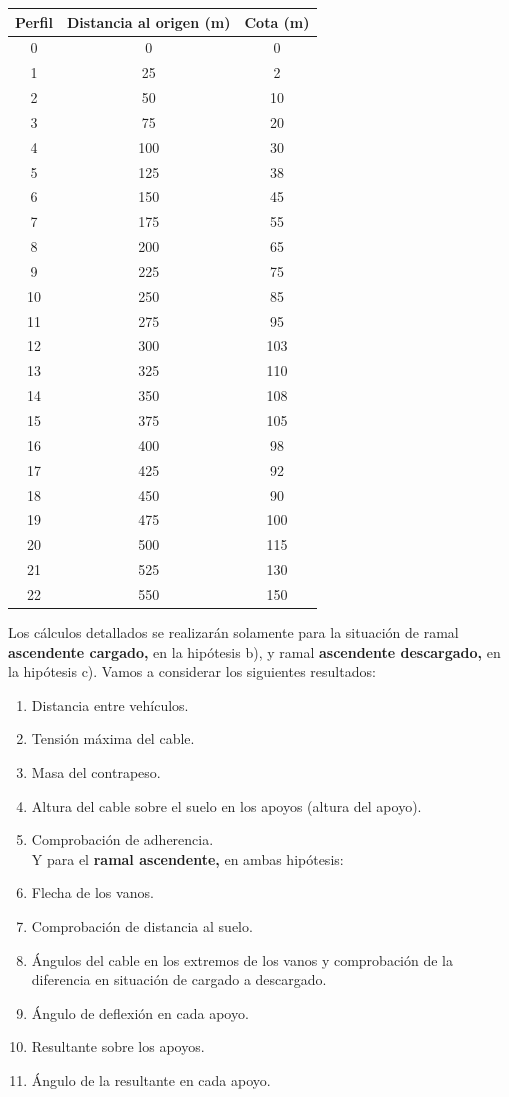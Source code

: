 \documentclass[a4paper,11pt]{article}
\begin{document}
\begin{table} \centering
\begin{tabular}{|c|c|c|}
\hline
Perfil & Distancia al origen (m) & Cota (m)\\
\hline
0 & 0 & 0\\
\hline
1 & 25 & 2\\
\hline
2 & 50 & 10\\
\hline
3 & 75 & 20\\
\hline
4 & 100 & 30\\
\hline
5 & 125 & 38\\
\hline
6 & 150 & 45\\
\hline
7 & 175 & 55\\
\hline
8 & 200 & 65\\
\hline
9 & 225 & 75\\
\hline
10 & 250 & 85\\
\hline
11 & 275 & 95\\
\hline
12 & 300 & 103\\
\hline
13 & 325 & 110\\
\hline
14 & 350 & 108\\
\hline
15 & 375 & 105\\
\hline
16 & 400 & 98\\
\hline
17 & 425 & 92\\
\hline
18 & 450 & 90\\
\hline
19 & 475 & 100\\
\hline
20 & 500 & 115\\
\hline
21 & 525 & 130\\
\hline
22 & 550 & 150\\
\hline
\end{tabular}
\end{table}
Los cálculos detallados se realizarán solamente para la situación de ramal {\bf ascendente cargado,} en la hipótesis b), y ramal {\bf ascendente descargado,} en la hipótesis c).
Vamos a considerar los siguientes resultados:
\begin{enumerate}[1)]
\item Distancia entre vehículos.
\item Tensión máxima del cable.
\item Masa del contrapeso.
\item Altura del cable sobre el suelo en los apoyos (altura del apoyo).
\item Comprobación de adherencia.\\
Y para el {\bf ramal ascendente,} en ambas hipótesis:
\item Flecha de los vanos.
\item Comprobación de distancia al suelo.
\item Ángulos del cable en los extremos de los vanos y comprobación de la diferencia en situación de cargado a descargado.
\item Ángulo de deflexión en cada apoyo.
\item Resultante sobre los apoyos.
\item Ángulo de la resultante en cada apoyo.
\end{enumerate}
\end{document}
